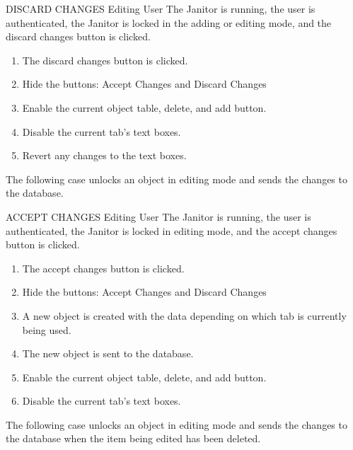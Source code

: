 \begin{usecase}
  {DISCARD CHANGES}
  {Editing User}
  {The Janitor is running, the user is authenticated, the Janitor is locked in the adding or editing mode, and the discard changes button is clicked.}
\begin{enumerate}
\item The discard changes button is clicked.
\item Hide the buttons: Accept Changes and Discard Changes
\item Enable the current object table, delete, and add button.
\item Disable the current tab's text boxes.
\item Revert any changes to the text boxes.
\end{enumerate}
\end{usecase}

The following case unlocks an object in editing mode and sends the changes to the database.

\begin{usecase}
  {ACCEPT CHANGES}
  {Editing User}
  {The Janitor is running, the user is authenticated,  the Janitor is locked in editing mode, and the accept changes button is clicked.}
\begin{enumerate}
\item The accept changes button is clicked.
\item Hide the buttons: Accept Changes and Discard Changes
\item A new object is created with the data depending on which tab is currently being used.
\item The new object is sent to the database.
\item Enable the current object table, delete, and add button.
\item Disable the current tab's text boxes.
\end{enumerate}
\end{usecase}

The following case unlocks an object in editing mode and sends the changes to the database when the item being edited has been deleted.

